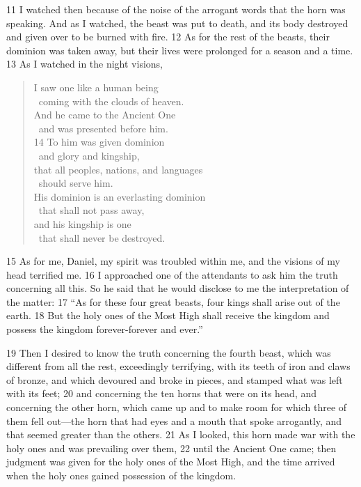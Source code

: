 11 I watched then because of the noise of the arrogant words that the horn was 
speaking. And as I watched, the beast was put to death, and its body destroyed 
and given over to be burned with fire. 12 As for the rest of the beasts, their 
dominion was taken away, but their lives were prolonged for a season and a time.
13 As I watched in the night visions,

\begin{verse}
I saw one like a human being \\
\vgap~coming with the clouds of heaven. \\
And he came to the Ancient One \\
\vgap~and was presented before him. \\
14 To him was given dominion \\
\vgap~and glory and kingship, \\
that all peoples, nations, and languages \\
\vgap~should serve him. \\
His dominion is an everlasting dominion \\
\vgap~that shall not pass away, \\
and his kingship is one \\
\vgap~that shall never be destroyed. \\
\end{verse}

15 As for me, Daniel, my spirit was troubled within me, and the visions of my 
head terrified me. 16 I approached one of the attendants to ask him the truth 
concerning all this. So he said that he would disclose to me the interpretation 
of the matter: 17 ``As for these four great beasts, four kings shall arise out of 
the earth. 18 But the holy ones of the Most High shall receive the kingdom and 
possess the kingdom forever-forever and ever.''

19 Then I desired to know the truth concerning the fourth beast, which was 
different from all the rest, exceedingly terrifying, with its teeth of iron and 
claws of bronze, and which devoured and broke in pieces, and stamped what was 
left with its feet; 20 and concerning the ten horns that were on its head, and 
concerning the other horn, which came up and to make room for which three of 
them fell out---the horn that had eyes and a mouth that spoke arrogantly, and that 
seemed greater than the others. 21 As I looked, this horn made war with the holy 
ones and was prevailing over them, 22 until the Ancient One came; then 
judgment was given for the holy ones of the Most High, and the time arrived when 
the holy ones gained possession of the kingdom.

